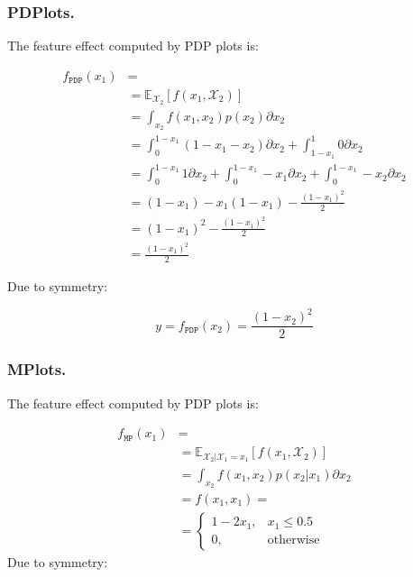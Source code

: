 \documentclass[wcp]{jmlr}
\newcommand{\E}{\mathbb{E}}
\begin{document}
\subsubsection*{PDPlots.}

The feature effect computed by PDP plots is:

\begin{equation}
  \label{eq:example-1-pdp}
  \begin{split}
    f_{\mathtt{PDP}}(x_1) &= \\
    & = \mathbb{\E}_{\mathcal{X}_2}[f(x_1,\mathcal{X}_2)] \\
    & = \int_{x_2} f(x_1, x_2) p(x_2) \partial x_2 \\
    & = \int_{0}^{1-x_1} (1 - x_1 - x_2) \partial x_2 + \int_{1-x_1}^1 0 \partial x_2 \\
    & = \int_{0}^{1-x_1} 1 \partial x_2 + \int_{0}^{1-x_1} -x_1 \partial x_2 + \int_{0}^{1-x_1} -x_2 \partial x_2 \\
    & = (1 - x_1) -x_1(1-x_1) - \frac{{(1-x_1)}^2}{2} \\
    & = (1 - x_1)^2 - \frac{{(1-x_1)}^2}{2} \\
    & = \frac{{(1-x_1)}^2}{2}
  \end{split}
\end{equation}

%
Due to symmetry:

\begin{equation}
y = f_{\mathtt{PDP}}(x_2) = \frac{{(1-x_2)}^2}{2}
\end{equation}

\subsubsection*{MPlots.}

The feature effect computed by PDP plots is:

\begin{equation}
  \label{eq:example-1-MPlots}
  \begin{split}
    f_{\mathtt{MP}}(x_1) &= \\
    & = \mathbb{\E}_{\mathcal{X}_2|\mathcal{X}_1=x_1}[f(x_1,\mathcal{X}_2)] \\
    & = \int_{x_2} f(x_1,x_2) p(x_2|x_1) \partial x_2 \\
    & =   f(x_1, x_1) = \\
  & = \begin{cases}
    1 - 2x_1, & x_1 \leq 0.5 \\
    0, & \text{otherwise}
\end{cases}
  \end{split}
\end{equation}
%
Due to symmetry:
\end{document}

